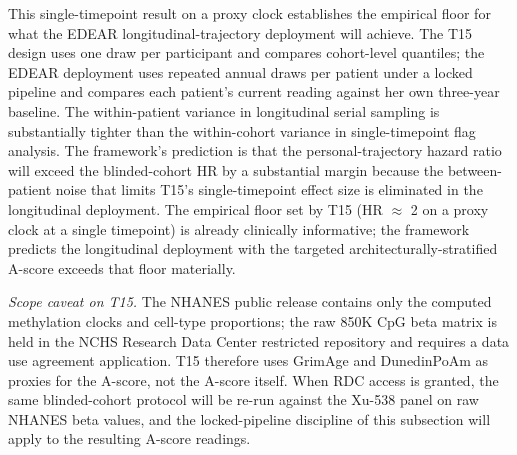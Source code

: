 \documentclass[12pt,a4paper]{article}
\begin{document}
This single-timepoint result on a proxy clock establishes the empirical
floor for what the EDEAR longitudinal-trajectory deployment will achieve.
The T15 design uses one draw per participant and compares cohort-level
quantiles; the EDEAR deployment uses repeated annual draws per patient
under a locked pipeline and compares each patient's current reading
against her own three-year baseline. The within-patient variance in
longitudinal serial sampling is substantially tighter than the
within-cohort variance in single-timepoint flag analysis. The framework's
prediction is that the personal-trajectory hazard ratio will exceed the
blinded-cohort HR by a substantial margin because the between-patient
noise that limits T15's single-timepoint effect size is eliminated in the
longitudinal deployment. The empirical floor set by T15 (HR $\approx$ 2
on a proxy clock at a single timepoint) is already clinically
informative; the framework predicts the longitudinal deployment with the
targeted architecturally-stratified A-score exceeds that floor
materially.

\textit{Scope caveat on T15.} The NHANES public release contains only
the computed methylation clocks and cell-type proportions; the raw 850K
CpG beta matrix is held in the NCHS Research Data Center restricted
repository and requires a data use agreement application. T15 therefore
uses GrimAge and DunedinPoAm as proxies for the A-score, not the
A-score itself. When RDC access is granted, the same blinded-cohort
protocol will be re-run against the Xu-538 panel on raw NHANES beta
values, and the locked-pipeline discipline of this subsection will apply
to the resulting A-score readings.
\end{document}

